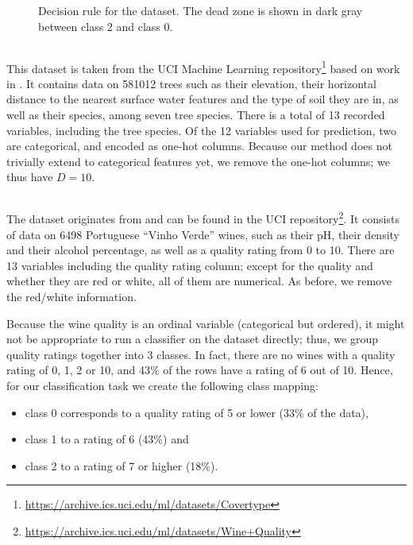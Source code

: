\documentclass[../main.tex]{subfiles}
\begin{document}
\begin{figure}[h]
    \centering
    
\caption{Decision rule for the \CakeOnSea dataset. The dead zone is shown in dark gray between class 2 and class 0.}
    \label{fig:cake_on_sea}
\end{figure}

\subsection{\ForestCover}

This dataset is taken from the UCI Machine Learning repository\footnote{\url{https://archive.ics.uci.edu/ml/datasets/Covertype}} \cite{duaUCI2019} based on work in \cite{blackardComparative1999}.
It contains data on 581012 trees such as their elevation, their horizontal distance to the nearest surface water features and the type of soil they are in, as well as their species, among seven tree species. There is a total of 13 recorded variables, including the tree species. Of the 12 variables used for prediction, two are categorical, and encoded as one-hot columns.
Because our method does not trivially extend to categorical features yet, we remove the one-hot columns; we thus have $D = 10$.

\subsection{\WineQuality}

The \WineQuality{} dataset originates from \cite{cortezModeling2009} and can be found in the UCI repository\footnote{\url{https://archive.ics.uci.edu/ml/datasets/Wine+Quality}}.
It consists of data on 6498 Portuguese ``Vinho Verde'' wines, such as their pH, their density and their alcohol percentage, as well as a quality rating from 0 to 10.
There are 13 variables including the quality rating column; except for the quality and whether they are red or white, all of them are numerical.
As before, we remove the red/white information.

Because the wine quality is an ordinal variable (categorical but ordered), it might not be appropriate to run a classifier on the dataset directly;
thus, we group quality ratings together into 3 classes.
In fact, there are no wines with a quality rating of 0, 1, 2 or 10, and 43\% of the rows have a rating of 6 out of 10.
Hence, for our classification task we create the following class mapping:
\begin{itemize}
    \item class 0 corresponds to a quality rating of 5 or lower (33\% of the data),
    \item class 1 to a rating of 6 (43\%) and
    \item class 2 to a rating of 7 or higher (18\%).
\end{itemize}
\end{document}
